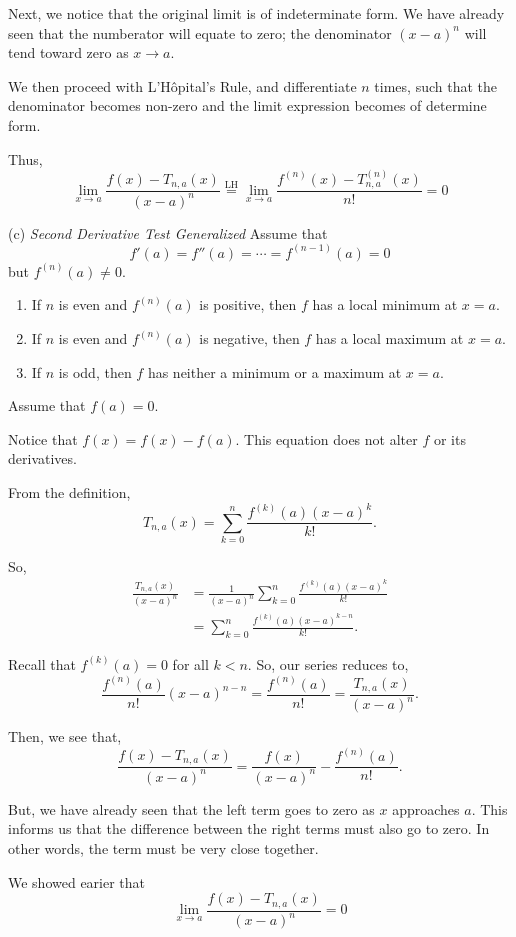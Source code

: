 \documentclass[../hw3]{subfiles}
\begin{document}
Next, we notice that the original limit is of indeterminate form. We have already seen that the numberator will equate to zero; the denominator ${(x-a)}^n$ will tend toward zero as $x\to a$.

We then proceed with L'Hôpital's Rule, and differentiate $n$ times, such that the denominator becomes non-zero and the limit expression becomes of determine form.

Thus, \[\lim\limits_{x\to a} \frac{f(x)-T_{n,a}(x)}{{(x-a)}^n} \stackrel{\text{LH}}{=} \lim\limits_{x\to a} \frac{f^{(n)}(x)-T^{(n)}_{n,a}(x)}{n!} = 0\]

(c) \textit{Second Derivative Test Generalized}
Assume that \[f'(a)=f''(a)=\cdots=f^{(n-1)}(a)=0\] but $f^{(n)}(a)\neq0$.
\begin{enumerate}[label= (\roman*)]
    \item If $n$ is even and $f^{(n)}(a)$ is positive, then $f$ has a local minimum at $x=a$.
    \item If $n$ is even and $f^{(n)}(a)$ is negative, then $f$ has a local maximum at $x=a$.
    \item If $n$ is odd, then $f$ has neither a minimum or a maximum at $x=a$.
\end{enumerate}

Assume that $f(a)=0$. 

Notice that $f(x)=f(x)-f(a)$. This equation does not alter $f$ or its derivatives.

From the definition, \[T_{n,a}(x)=\sum_{k=0}^{n} \frac{f^{(k)}(a){(x-a)}^k}{k!}.\]

So,
\begin{align*}
    \frac{T_{n,a}(x)}{{(x-a)}^n}&=\frac{1}{{(x-a)}^n} \sum_{k=0}^{n} \frac{f^{(k)}(a){(x-a)}^k}{k!}\\
    &=\sum_{k=0}^{n} \frac{f^{(k)}(a){(x-a)}^{k-n}}{k!}.
\end{align*}

Recall that $f^{(k)}(a)=0$ for all $k<n$. So, our series reduces to,
\[\frac{f^{(n)}(a)}{n!}{(x-a)}^{n-n} = \frac{f^{(n)}(a)}{n!} = \frac{T_{n,a}(x)}{{(x-a)}^n}.\]

Then, we see that,
\[\frac{f(x)-T_{n,a}(x)}{{(x-a)}^n}=\frac{f(x)}{{(x-a)}^n}-\frac{f^{(n)}(a)}{n!}.\]

But, we have already seen that the left term goes to zero as $x$ approaches $a$. This informs us that the difference between the right terms must also go to zero. In other words, the term must be very close together.

We showed earier that \[\lim\limits_{x\to a} \frac{f(x)-T_{n,a}(x)}{{(x-a)}^n}=0\]
\end{document}
